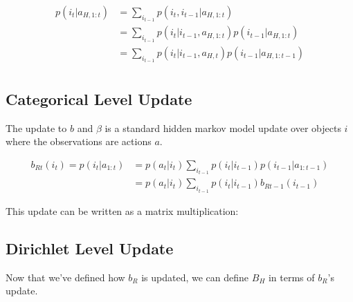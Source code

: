 \documentclass{article}
\begin{document}
\begin{align*}
	p(i_t | a_{H,1:t}) &= \sum_{i_{t-1}} p(i_t, i_{t-1} | a_{H, 1:t}) \\
	&= \sum_{i_{t-1}} p(i_t| i_{t-1} , a_{H, 1:t}) p(i_{t-1} | a_{H,1:t}) \\
	&= \sum_{i_{t-1}} p(i_t| i_{t-1} , a_{H,t}) p(i_{t-1} | a_{H,1:t-1}) \\
\end{align*}

\subsection{Categorical Level Update} 

The update to $b$ and $\beta$ is a standard hidden markov model update over objects $i$ where the observations are actions $a$. 

\begin{align} 
	b_{Rt}(i_{t}) = p(i_{t}|a_{1:t}) &= p(a_t |i_t) \sum_{i_{t-1}} p(i_{t}|i_{t-1})  p(i_{t-1} | a_{1:t-1}) \\ 
	&= p(a_t |i_t) \sum_{i_{t-1}} p(i_{t}|i_{t-1}) b_{Rt-1}(i_{t-1}) 
\end{align}

This update can be written as a matrix multiplication: 




\subsection{Dirichlet Level Update}

Now that we've defined how $b_R$ is updated, we can define $B_H$ in terms of $b_R$'s update. 
\end{document}
